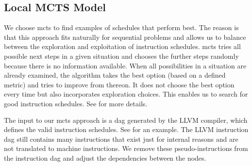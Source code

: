 \subsection{Local MCTS Model}
\label{subsec:approach:ml:mcts}
We choose \ac{mcts} to find examples of schedules that perform best.
The reason is that this approach fits naturally for sequential problems and allows us to balance between the exploration and exploitation of instruction schedules. 
\ac{mcts} tries all possible next steps in a given situation and chooses the further steps randomly because there is no information available.
When all possibilities in a situation are already examined, the algorithm takes the best option (based on a defined metric) and tries to improve from thereon.
It does not choose the best option every time but also incorporates exploration choices.
This enables us to search for good instruction schedules.
See  for more details.

The input to our \ac{mcts} approach is a \ac{dag} generated by the LLVM compiler, which defines the valid instruction schedules.
See  for an example.
The LLVM instruction \ac{dag} still contains many instructions that exist just for internal reasons and are not translated to machine instructions.
We remove these pseudo-instructions from the instruction \ac{dag} and adjust the dependencies between the nodes.

